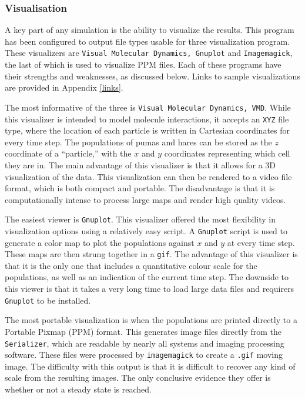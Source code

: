 \documentclass[a4paper,11pt]{article}
\begin{document}
\subsubsection{Visualisation}\label{visual}

A key part of any simulation is the ability to visualize the results.  This program has been configured to output file types usable for three visualization program.  These visualizers are \texttt{Visual Molecular Dynamics, Gnuplot} and \texttt{Imagemagick}, the last of which is used to visualize PPM files.  Each of these programs have their strengths and weaknesses, as discussed below.  Links to sample visualizations are provided in Appendix \ref{links}.

The most informative of the three is \texttt{Visual Molecular Dynamics, VMD}.  While this visualizer is intended to model molecule interactions, it accepts an \texttt{XYZ} file type, where the location of each particle is written in Cartesian coordinates for every time step.  The populations of pumas and hares can be stored as the $z$ coordinate of a ``particle,'' with the $x$ and $y$ coordinates representing which cell they are in.  The main advantage of this visualizer is that it allows for a 3D visualization of the data.  This visualization can then be rendered to a video file format, which is both compact and portable.  The disadvantage is that it is computationally intense to process large maps and render high quality videos.  

The easiest viewer is \texttt{Gnuplot}.  This visualizer offered the most flexibility in visualization options using a relatively easy script.  A \texttt{Gnuplot} script is used to generate a color map to plot the populations against $x$ and $y$ at every time step.  These maps are then strung together in a \texttt{gif}.  The advantage of this visualizer is that it is the only one that includes a quantitative colour scale for the populations, as well as an indication of the current time step.  The downside to this viewer is that it takes a very long time to load large data files and requirers \texttt{Gnuplot} to be installed.

The most portable visualization is when the populations are printed directly to a Portable Pixmap (PPM) format.  This generates image files directly from the \texttt{Serializer}, which are readable by nearly all systems and imaging processing software.  These files were processed by \texttt{imagemagick} to create a \texttt{.gif} moving image.  The difficulty with this output is that it is difficult to recover any kind of scale from the resulting images.  The only conclusive evidence they offer is whether or not a steady state is reached.  
\end{document}
